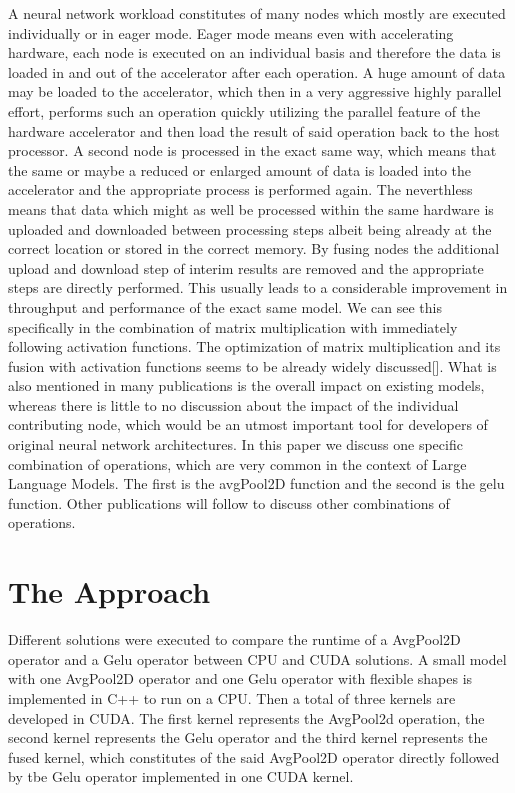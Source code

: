 \documentclass[letterpaper]{article}
\begin{document}
A neural network workload constitutes of many nodes which mostly are executed individually or in eager mode. Eager mode means even with accelerating hardware, each node is executed on an individual basis and therefore the data is loaded in and out of the accelerator after each operation. A huge amount of data may be loaded to the accelerator, which then in a very aggressive highly parallel effort, performs such an operation quickly utilizing the parallel feature of the hardware accelerator and then load the result of said operation back to the host processor. A second node is processed in the exact same way, which means that the same or maybe a reduced or enlarged amount of data is loaded into the accelerator and the appropriate process is performed again. The neverthless means that data which might as well be processed within the same hardware is uploaded and downloaded between processing steps albeit being already at the correct location or stored in the correct memory.  
By fusing nodes the additional upload and download step of interim results are removed and the appropriate steps are directly performed. This usually leads to a considerable improvement in throughput and performance of the exact same model. We can see this specifically in the combination of matrix multiplication with immediately following activation functions. The optimization of matrix multiplication and its fusion with activation functions seems to be already widely discussed[]. What is also mentioned in many publications is the overall impact on existing models, whereas there is little to no discussion about the impact of the individual contributing node, which would be an utmost important tool for developers of original neural network architectures. In this paper we discuss one specific combination of operations, which are very common in the context of Large Language Models. The first is the avgPool2D function and the second is the gelu function. Other publications will follow to discuss other combinations of operations. 

\section{The Approach}
Different solutions were executed to compare the runtime of a AvgPool2D operator and a Gelu operator between CPU and CUDA solutions. A small model with one AvgPool2D operator and one Gelu operator with flexible shapes is implemented in C++ to run on a CPU. Then a total of three kernels are developed in CUDA. The first kernel represents the AvgPool2d operation, the second kernel represents the Gelu operator and the third kernel represents the fused kernel, which constitutes of the said AvgPool2D operator directly followed by tbe Gelu operator implemented in one CUDA kernel. 
\end{document}
